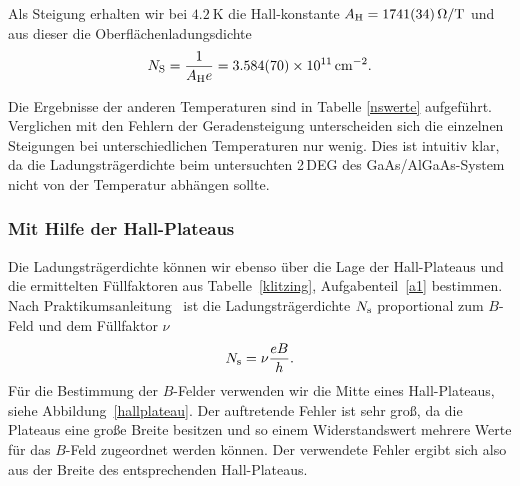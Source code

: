 \documentclass[paper=a4,fontsize=10pt,DIV=18,twocolumn,parskip=half]{scrartcl}
\numberwithin{equation}{section}    %
\newcommand{\kor}[1]{{\color{darkgreen}#1}}
\begin{document}
Als Steigung erhalten wir bei $\SI{4.2}{\kelvin}$ die Hall-konstante \kor{$A_{\rm H}=\SI[per-mode=symbol]{1741(34)}{\ohm\per\tesla}$} und aus dieser die Oberflächenladungsdichte
\kor{\begin{equation}
N_{\rm S}=\frac{1}{A_{\rm H} e} = \SI{3.584(70)e11}{\per\square\centi\meter}.
\label{ns1}
\end{equation}}

Die Ergebnisse der anderen Temperaturen sind in Tabelle \ref{nswerte} aufgeführt.
Verglichen mit den Fehlern der Geradensteigung unterscheiden sich die einzelnen Steigungen bei unterschiedlichen Temperaturen nur wenig. Dies ist intuitiv klar, da die Ladungsträgerdichte beim untersuchten 2\,DEG des GaAs/AlGaAs-System nicht von der Temperatur abhängen sollte.

\subsubsection*{Mit Hilfe der Hall-Plateaus}
Die Ladungsträgerdichte können wir ebenso über die Lage der Hall-Plateaus und die ermittelten Füllfaktoren aus Tabelle~\ref{klitzing}, Aufgabenteil~\ref{a1} bestimmen. Nach Praktikumsanleitung~\citep{anleitung} ist die Ladungsträgerdichte $N_{\rm s}$ proportional zum $B$-Feld und dem Füllfaktor $\nu$
\begin{equation}
	N_{\rm s} = \nu\frac{e B}{h}.
	\label{eq.Ns}
\end{equation}
\kor{Für die Bestimmung der $B$-Felder verwenden wir die Mitte eines Hall-Plateaus, siehe Abbildung~\ref{hallplateau}. Der auftretende Fehler ist sehr groß, da die Plateaus eine große Breite besitzen und so einem Widerstandswert mehrere Werte für das $B$-Feld zugeordnet werden können. Der verwendete Fehler ergibt sich also aus der Breite des entsprechenden Hall-Plateaus.}
\end{document}
